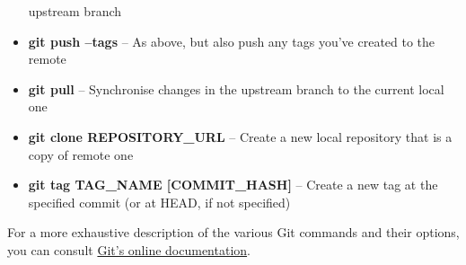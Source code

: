 \documentclass[9pt]{extarticle}
\begin{document}
\begin{bluebox}[title=Git Command Cheat Sheet]
\begin{itemize}
    upstream branch
  \item \textbf{git push --tags} -- As above, but also push any tags you've created to
    the remote
  \item \textbf{git pull} -- Synchronise changes in the upstream branch to the current
    local one
  \item \textbf{git clone REPOSITORY\_URL} -- Create a new local repository that is a
    copy of remote one
  \item \textbf{git tag TAG\_NAME [COMMIT\_HASH]} -- Create a new tag at the specified
    commit (or at HEAD, if not specified)
  \end{itemize}
\end{bluebox}

For a more exhaustive description of the various Git commands and their options, you can
consult \href{https://git-scm.com/docs}{Git's online documentation}.


\furtherhelp
\end{document}
